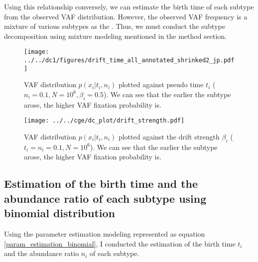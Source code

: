 \documentclass{article}
\begin{document}
Using this relationship conversely, we can estimate the birth time of each subtype from the observed VAF distribution.
However, the observed VAF frequency is a mixture of various subtypes as the .
Thus, we must conduct the subtype decomposition using mixture modeling mentioned in the method section.

\begin{figure}[H]
 \begin{minipage}[c]{0.47\hsize}
 \begin{center}
  \texttt{[image: ../../dc1/figures/drift\_time\_all\_annotated\_shrinked2\_jp.pdf]}
 \end{center}
    \caption{
  VAF distribution $p(x_i | t_i, n_i)$ plotted against pseudo time $t_i$ ($n_i=0.1, N=10^6, \beta_i=0.5$).
  We can see that the earlier the subtype arose, the higher VAF fixation probability is.
  }
    \label{fig: vaf_against_time}
\end{minipage}
 \hspace{1truecm}
\begin{minipage}[c]{0.47\hsize}
 \begin{center}
\texttt{[image: ../../cge/dc\_plot/drift\_strength.pdf]}
 \end{center}
   \caption{
 VAF distribution $p(x_i | t_i, n_i)$ plotted against the drift strength $\beta_i$ ($t_i= n_i=0.1, N=10^6$).
 We can see that the earlier the subtype arose, the higher VAF fixation probability is.
  }
   \label{vaf_against_strength}
\end{minipage}
\end{figure}

\subsection{Estimation of the birth time and the abundance ratio of each subtype using binomial distribution}
Using the parameter estimation modeling represented as equation \ref{param_estimation_binomial}, I conducted the estimation of the birth time $t_i$ and the abundance ratio $n_i$ of each subtype.

\end{document}
